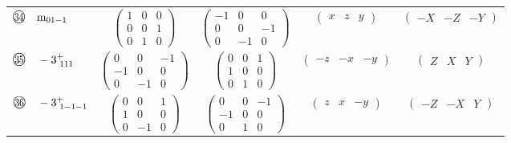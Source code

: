 \documentclass[fleqn,10pt,landscape]{jsarticle}
\begin{document}
\begin{center}
\begin{longtable}{lcccc}
$ {\ooalign{\hfil\resizebox{.8\width}{\height}{34}\hfil\crcr\raise.1ex\hbox{\large$\bigcirc$}}}\quad {\rm m}_{01-1} $ & $ \begin{pmatrix} 1 & 0 & 0 \\ 0 & 0 & 1 \\ 0 & 1 & 0 \end{pmatrix} $ & $ \begin{pmatrix} -1 & 0 & 0 \\ 0 & 0 & -1 \\ 0 & -1 & 0 \end{pmatrix} $ & $ \begin{pmatrix} x & z & y \end{pmatrix} $ & $ \begin{pmatrix} - X & - Z & - Y \end{pmatrix} $ \\
$ {\ooalign{\hfil\resizebox{.8\width}{\height}{35}\hfil\crcr\raise.1ex\hbox{\large$\bigcirc$}}}\quad -3^{+}_{\,\,111} $ & $ \begin{pmatrix} 0 & 0 & -1 \\ -1 & 0 & 0 \\ 0 & -1 & 0 \end{pmatrix} $ & $ \begin{pmatrix} 0 & 0 & 1 \\ 1 & 0 & 0 \\ 0 & 1 & 0 \end{pmatrix} $ & $ \begin{pmatrix} - z & - x & - y \end{pmatrix} $ & $ \begin{pmatrix} Z & X & Y \end{pmatrix} $ \\
$ {\ooalign{\hfil\resizebox{.8\width}{\height}{36}\hfil\crcr\raise.1ex\hbox{\large$\bigcirc$}}}\quad -3^{+}_{\,\,1-1-1} $ & $ \begin{pmatrix} 0 & 0 & 1 \\ 1 & 0 & 0 \\ 0 & -1 & 0 \end{pmatrix} $ & $ \begin{pmatrix} 0 & 0 & -1 \\ -1 & 0 & 0 \\ 0 & 1 & 0 \end{pmatrix} $ & $ \begin{pmatrix} z & x & - y \end{pmatrix} $ & $ \begin{pmatrix} - Z & - X & Y \end{pmatrix} $ \\

\end{longtable}
\end{center}
\end{document}
